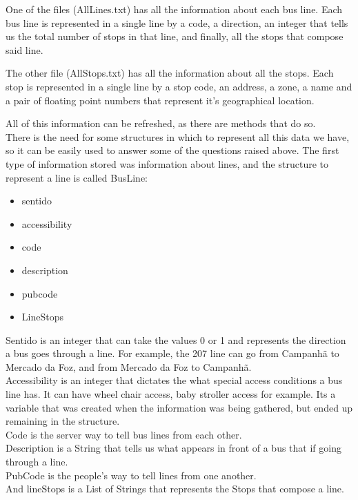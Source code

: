 \documentclass[12pt]{article}
\begin{document}
\begin{multicols}{2}
One of the files (AllLines.txt) has all the information about each bus line.
Each bus line is represented in a single line by a code, a direction, an integer that tells us the total number of stops in that line, and finally, all the stops that compose said line.

The other file (AllStops.txt) has all the information about all the stops.
Each stop is represented in a single line by a stop code, an address, a zone, a name and a pair of floating point numbers that represent it's geographical location. 

All of this information can be refreshed, as there are methods that do so.\\

There is the need for some structures in which to represent all this data we have, so it can be easily used to answer some of the questions raised above. The first type of information stored was information about lines, and the structure to represent a line is called BusLine:
\begin{itemize}
\item sentido
\item accessibility
\item code
\item description
\item pubcode
\item LineStops
\end{itemize}
Sentido is an integer that can take the values 0 or 1 and represents the direction a bus goes through a line. For example, the 207 line can go from Campanhã to Mercado da Foz, and from Mercado da Foz to Campanhã.\\
Accessibility is an integer that dictates the what special access conditions a bus line has. It can have wheel chair access, baby stroller access for example. Its a variable that was created when the information was being gathered, but ended up remaining in the structure.\\
Code is the server way to tell bus lines from each other.\\
Description is a String that tells us what appears in front of a bus that if going through a line.\\
PubCode is the people's way to tell lines from one another.\\
And lineStops is a List of Strings that represents the Stops that compose a line.\\


\end{multicols}
\end{document}
